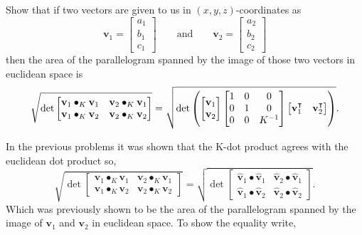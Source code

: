 \documentclass[newpage,hints,handout,12pt,noauthor,nooutcomes]{ximera}
\begin{document}
\begin{problem}
  
  Show that if two vectors are given to us in $(x,y,z)$-coordinates as
  \[
  \mathbf{v}_{1}=\begin{bmatrix}a_{1} \\ b_{1} \\ c_{1}\end{bmatrix}
  \qquad\text{and}\qquad
  \mathbf{v}_{2} =\begin{bmatrix}a_{2} \\ b_{2} \\ c_{2}\end{bmatrix}
  \]
  then the area of the parallelogram spanned by the image of those two vectors in
  euclidean space is%
  \[
  \sqrt{\det
    \begin{bmatrix}
      \mathbf{v}_{1}\bullet_{K}\mathbf{v}_{1} & \mathbf{v}_{2}\bullet_{K}\mathbf{v}_{1}\\
      \mathbf{v}_{1}\bullet_{K}\mathbf{v}_{2} & \mathbf{v}_{2}\bullet_{K}\mathbf{v}_{2}%
    \end{bmatrix}}
  =\sqrt{\det\left( 
      \begin{bmatrix}
        \mathbf{v}_{1} \\
        \mathbf{v}_{2}
      \end{bmatrix}
      \begin{bmatrix}
        1 & 0 & 0\\
        0 & 1 & 0\\
        0 & 0 & K^{-1}%
      \end{bmatrix}
      \begin{bmatrix}
        \mathbf{v}_{1}^\transpose & \mathbf{v}_{2}^\transpose%
      \end{bmatrix}
    \right) }.
\]


\begin{freeResponse} In the previous problems it was shown that the K-dot product agrees with the euclidean dot product so, 
\[
\sqrt{\det
\begin{bmatrix}
\mathbf{v}_{1}\bullet_{K}\mathbf{v}_{1} & \mathbf{v}_{2}\bullet_{K}\mathbf{v}_{1}\\
\mathbf{v}_{1}\bullet_{K}\mathbf{v}_{2} & \mathbf{v}_{2}\bullet_{K}\mathbf{v}_{2}%
\end{bmatrix}}
=
\sqrt{\det
\begin{bmatrix}
\hat{\mathbf v}_{1}\bullet \hat{\mathbf v}_{1} & \hat{\mathbf v}_{2}\bullet \hat{\mathbf v}_{1}\\
\hat{\mathbf v}_{1}\bullet \hat{\mathbf v}_{2} & \hat{\mathbf v}_{2}\bullet \hat{\mathbf v}_{2}%
\end{bmatrix}}.
\]
Which was previously shown to be the area of the parallelogram spanned by the image of $\mathbf{v}_1$ and $\mathbf{v}_2$ in euclidean space. To show the equality write,


\end{freeResponse}
\end{problem}
\end{document}
